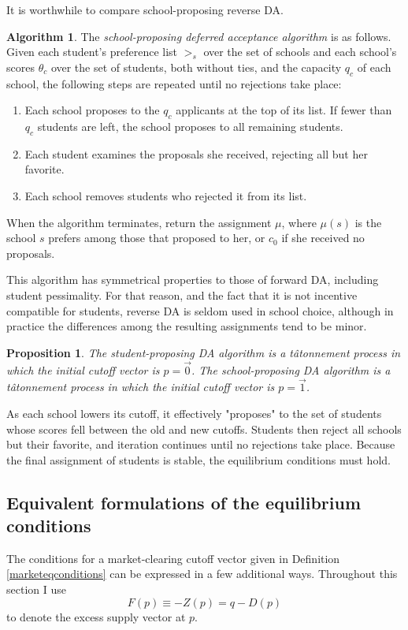 \documentclass[12pt]{article}
\newtheorem{proposition}{Proposition}
\theoremstyle{definition}
\newtheorem{algorithm}{Algorithm}
\begin{document}
It is worthwhile to compare school-proposing reverse DA. 
\begin{algorithm}
The \emph{school-proposing deferred acceptance algorithm} is as follows. Given each student's preference list $>_s$ over the set of schools and each school's scores $\theta_c$ over the set of students, both without ties, and the capacity $q_c$ of each school, the following steps are repeated until no rejections take place:
\begin{enumerate}
\item Each school proposes to the $q_c$ applicants at the top of its list. If fewer than $q_c$ students are left, the school proposes to all remaining students.
\item Each student examines the proposals she received, rejecting all but her favorite.
\item Each school removes students who rejected it from its list.
\end{enumerate}
When the algorithm terminates, return the assignment $\mu$, where $\mu(s)$ is the school $s$ prefers among those that proposed to her, or $c_0$ if she received no proposals.
\end{algorithm}
This algorithm has symmetrical properties to those of forward DA, including student pessimality. For that reason, and the fact that it is not incentive compatible for students, reverse DA is seldom used in school choice, although in practice the differences among the resulting assignments tend to be minor.

\begin{proposition}The student-proposing DA algorithm is a t\^{a}tonnement process in which the initial cutoff vector is $p = \vec 0$. The school-proposing DA algorithm is a t\^{a}tonnement process in which the initial cutoff vector is $p = \vec 1$. \end{proposition}

As each school lowers its cutoff, it effectively "proposes" to the set of students whose scores fell between the old and new cutoffs. Students then reject all schools but their favorite, and iteration continues until no rejections take place. Because the final assignment of students is stable, the equilibrium conditions must hold. 


\subsection{Equivalent formulations of the equilibrium conditions}
The conditions for a market-clearing cutoff vector given in Definition \ref{marketeqconditions} can be expressed in a few additional ways. Throughout this section I use \[F(p) \equiv -Z(p) = q - D(p)\]
to denote the excess supply vector at $p$. 
\end{document}

